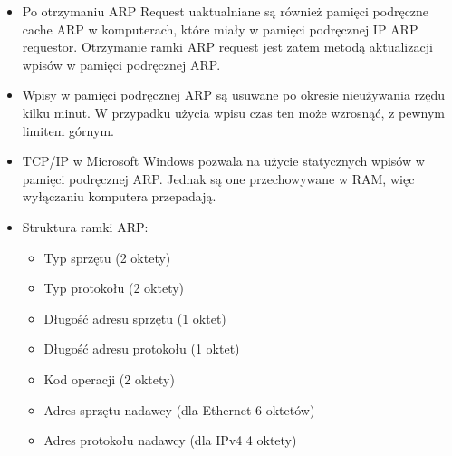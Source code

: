 \documentclass[../main.tex]{subfiles}
\begin{document}
\begin{itemize}
        \item Po otrzymaniu ARP Request uaktualniane są również pamięci podręczne cache ARP w
        komputerach, które miały w pamięci podręcznej IP ARP requestor. Otrzymanie ramki ARP request jest zatem metodą aktualizacji wpisów w
        pamięci podręcznej ARP.
        \item Wpisy w pamięci podręcznej ARP są usuwane po okresie nieużywania rzędu kilku minut. W
        przypadku użycia wpisu czas ten może wzrosnąć, z pewnym limitem górnym.
        \item TCP/IP w Microsoft Windows pozwala na użycie statycznych wpisów w pamięci podręcznej
        ARP. Jednak są one przechowywane w RAM, więc wyłączaniu komputera przepadają.
        \item Struktura ramki ARP:
        \begin{itemize}
            \item Typ sprzętu (2 oktety)
            \item Typ protokołu (2 oktety)
            \item Długość adresu sprzętu (1 oktet)
            \item Długość adresu protokołu (1 oktet)
            \item Kod operacji (2 oktety)
            \item Adres sprzętu nadawcy (dla Ethernet 6 oktetów)
            \item Adres protokołu nadawcy (dla IPv4 4 oktety)
        \end{itemize}
    \end{itemize}
\end{document}
